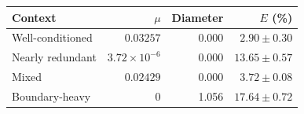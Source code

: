 \begin{tabular}{lrrr}\toprule
Context&$\mu$&Diameter&$E$ (\%)\\
\midrule
Well-conditioned & $0.03257$ & 0.000 & $2.90\pm0.30$ \\
Nearly redundant & $3.72\times10^{-6}$ & 0.000 & $13.65\pm0.57$ \\
Mixed & $0.02429$ & 0.000 & $3.72\pm0.08$ \\
Boundary-heavy & $0$ & 1.056 & $17.64\pm0.72$ \\
\bottomrule\end{tabular}

